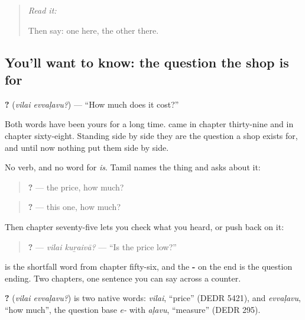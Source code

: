 \label{lesson:TA-C80-price}



\begin{quote}
\emph{Read it:} \textbf{}

Then say: one here, the other there.
\end{quote}

\subsection*{You'll want to know: the question the shop is for}
\textbf{ ?} (\emph{vilai evvaḷavu?}) — \textquotedblleft{}How much does it cost?\textquotedblright{}

Both words have been yours for a long time. \textbf{} came in chapter thirty-nine and \textbf{} in chapter sixty-eight. Standing side by side they are the question a shop exists for, and until now nothing put them side by side.

No verb, and no word for \emph{is}. Tamil names the thing and asks about it:

\begin{quote}
\textbf{ ?} — the price, how much?
\end{quote}

\begin{quote}
\textbf{ ?} — this one, how much?
\end{quote}

Then chapter seventy-five lets you check what you heard, or push back on it:

\begin{quote}
\textbf{ ?} — \emph{vilai kuṟaivā?} — \textquotedblleft{}Is the price low?\textquotedblright{}
\end{quote}

\textbf{} is the shortfall word from chapter fifty-six, and the \textbf{-} on the end is the question ending. Two chapters, one sentence you can say across a counter.

\begin{cousinweb}
\textbf{ ?} (\emph{vilai evvaḷavu?}) is two native words: \emph{vilai}, \textquotedblleft{}price\textquotedblright{} (DEDR 5421), and \emph{evvaḷavu}, \textquotedblleft{}how much\textquotedblright{}, the question base \emph{e-} with \emph{aḷavu}, \textquotedblleft{}measure\textquotedblright{} (DEDR 295).
\end{cousinweb}

